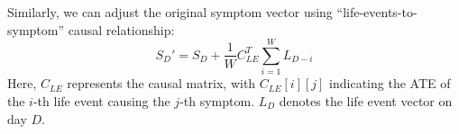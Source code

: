 Similarly, we can adjust the original symptom vector using ``life-events-to-symptom'' causal relationship:
\begin{equation}
    S_D'=S_D+\frac{1}{W}C_{LE}^T\sum_{i=1}^W L_{D-i}
\end{equation}
Here, $C_{LE}$ represents the causal matrix, with $C_{LE}[i][j]$ indicating the ATE of the $i$-th life event causing the $j$-th symptom. $L_D$ denotes the life event vector on day $D$.






